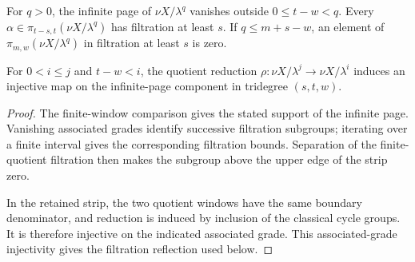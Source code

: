 \begin{theorem}
\label{sem:ProofTools:finite-strip}
For $q>0$, the infinite page of $\nu X/\lambda^q$ vanishes outside $0\leq t-w<q$. Every $\alpha\in\pi_{t-s,t}(\nu X/\lambda^q)$ has filtration at least $s$. If $q\leq m+s-w$, an element of $\pi_{m,w}(\nu X/\lambda^q)$ in filtration at least $s$ is zero.

For $0<i\leq j$ and $t-w<i$, the quotient reduction $\rho:\nu X/\lambda^j\to\nu X/\lambda^i$ induces an injective map on the infinite-page component in tridegree $(s,t,w)$.
\end{theorem}
\begin{proof}
The finite-window comparison gives the stated support of the infinite page. Vanishing associated grades identify successive filtration subgroups; iterating over a finite interval gives the corresponding filtration bounds. Separation of the finite-quotient filtration then makes the subgroup above the upper edge of the strip zero.

In the retained strip, the two quotient windows have the same boundary denominator, and reduction is induced by inclusion of the classical cycle groups. It is therefore injective on the indicated associated grade. This associated-grade injectivity gives the filtration reflection used below.
\end{proof}

